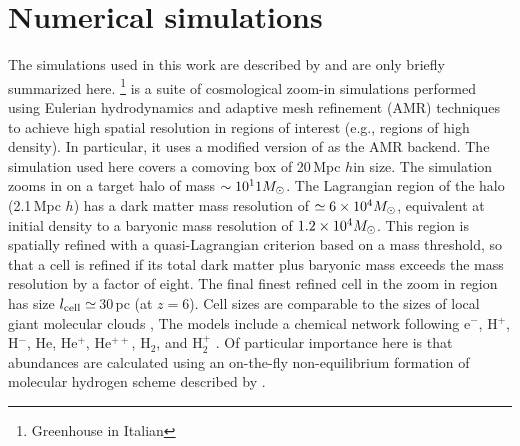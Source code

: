 \IfFileExists{emulateapjlegacy.cls}{\documentclass[iop]{emulateapjlegacy}}{\documentclass[iop]{emulateapj}}
\newcommand{\AP}[1]{({\bf \color{apcolor} AP: #1})}
\newcommand{\MM}[1]{({\bf \color{mmcolor} MM: #1})}
\begin{document}
\section{Numerical simulations}\label{sec:sim}
The simulations used in this work are described by \citealt{Pallottini17a, Pallottini17b} and are only briefly summarized here.
%
\footnote{Greenhouse in Italian} is a suite of cosmological zoom-in simulations performed using Eulerian hydrodynamics and adaptive mesh refinement (AMR) techniques to achieve high spatial resolution in regions of interest (e.g., regions of high density).
%
In particular, it uses a modified version of 
\citep{Teyssier02a} as the AMR backend. The simulation used here
covers a comoving box of 20\,Mpc $h$\pmOne in size. The simulation
zooms in on a target halo of mass $\sim 10^11 \mbox{$M_{\odot}$}$. The Lagrangian
region of the halo (2.1\,Mpc $h$\pmOne) has a dark matter
mass resolution of $\simeq 6\times 10^4 \mbox{$M_{\odot}$}$, 
     equivalent at initial density to a baryonic mass resolution of $1.2
     \times 10^4 \mbox{$M_{\odot}$}$.  This 
region is spatially refined with a quasi-Lagrangian criterion based on
a mass threshold, so that a cell is refined if its total dark matter
plus baryonic mass exceeds the mass resolution by a factor of
eight. The final finest refined cell in the zoom in region has size
$l_{\rm cell}\simeq$\,30\,pc (at $z = 6$). 
     Cell sizes are comparable to the sizes of local giant molecular clouds \citep[e.g.,][]{Sanders85a, Federrath13a, Goodman14a},
The models include a chemical network 
following e$^{-}$, H$^+$, H$^-$, He, He$^+$, He$^{++}$, H$_2$, and
H$_2^+$ \citep{Grassi14a,Bovino16a}. Of particular importance here is
that abundances are calculated using an on-the-fly non-equilibrium
formation of molecular hydrogen scheme  
    described by \citet{Pallottini17a}.
\end{document}
